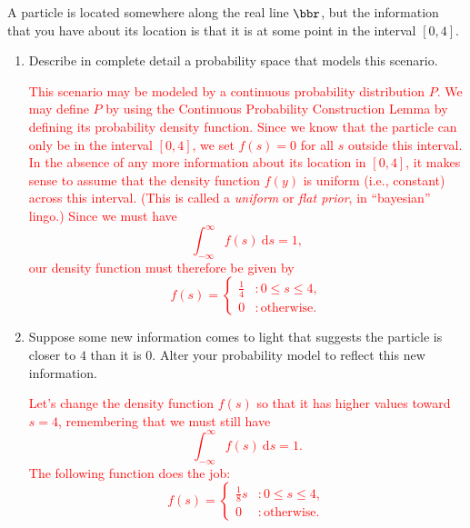 \documentclass[12pt,reqno]{amsart}
\begin{document}
\bigskip
\prob A particle is located somewhere along the real line $\bbr$, but the  information that you have about its location is that it is at some point in the interval $[0,4]$.

\medskip
\begin{enumerate}
    \item Describe in complete detail a probability space that models this scenario.

    \bigskip
    \textcolor{red}{This scenario may be modeled by a continuous probability distribution $P$. We may define $P$ by using the Continuous Probability Construction Lemma by defining its probability density function. Since we know that the particle can only be in the interval $[0,4]$, we set $f(s)=0$ for all $s$ outside this interval. In the absence of any more information about its location in $[0,4]$, it makes sense to assume that the density function $f(y)$ is uniform (i.e., constant) across this interval. (This is called a \textit{uniform} or \textit{flat prior}, in ``bayesian'' lingo.) Since we must have
        \[\int_{-\infty}^\infty f(s) \ \text{d} s=1,\]
    our density function must therefore be given by
        \[f(s) = \begin{cases} \frac{1}{4} & : 0 \leq s \leq 4, \\ 0 & : \text{otherwise}.\end{cases}\]}
    \bigskip

    \item Suppose some new information comes to light that suggests the particle is closer to $4$ than it is $0$. Alter your probability model to reflect this new information.
    
    \bigskip
    \textcolor{red}{Let's change the density function $f(s)$ so that it has higher values toward $s=4$, remembering that we must still have
        \[\int_{-\infty}^\infty f(s) \ \text{d} s = 1.\]
    The following function does the job:
        \[f(s) = \begin{cases}
            \frac{1}{8}s & : 0 \leq s \leq 4, \\
            0 & : \text{otherwise}.
        \end{cases}\]}
\end{enumerate}
    
\end{document}

